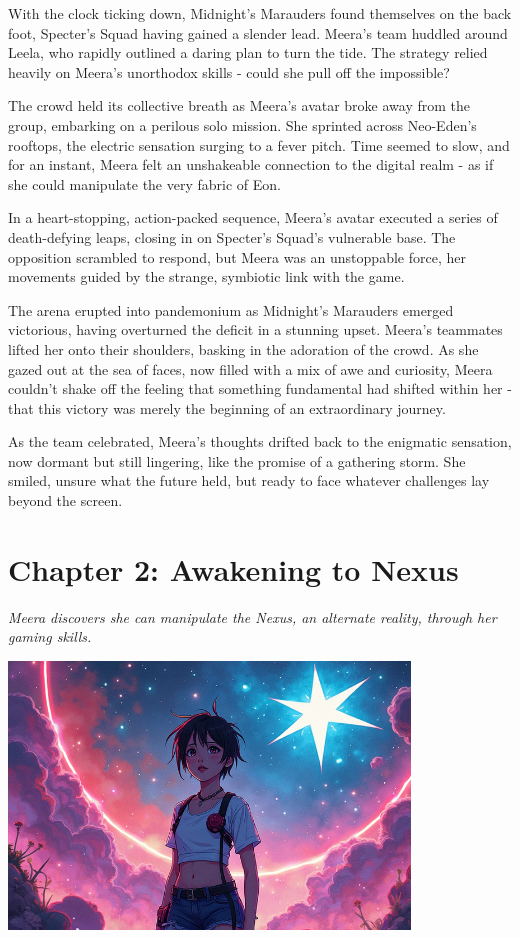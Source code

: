 \documentclass[12pt]{report}  %
\begin{document}
With the clock ticking down, Midnight's Marauders found themselves on
the back foot, Specter's Squad having gained a slender lead. Meera's
team huddled around Leela, who rapidly outlined a daring plan to turn
the tide. The strategy relied heavily on Meera's unorthodox skills -
could she pull off the impossible?

The crowd held its collective breath as Meera's avatar broke away from
the group, embarking on a perilous solo mission. She sprinted across
Neo-Eden's rooftops, the electric sensation surging to a fever pitch.
Time seemed to slow, and for an instant, Meera felt an unshakeable
connection to the digital realm - as if she could manipulate the very
fabric of Eon.

In a heart-stopping, action-packed sequence, Meera's avatar executed a
series of death-defying leaps, closing in on Specter's Squad's
vulnerable base. The opposition scrambled to respond, but Meera was an
unstoppable force, her movements guided by the strange, symbiotic link
with the game.

The arena erupted into pandemonium as Midnight's Marauders emerged
victorious, having overturned the deficit in a stunning upset. Meera's
teammates lifted her onto their shoulders, basking in the adoration of
the crowd. As she gazed out at the sea of faces, now filled with a mix
of awe and curiosity, Meera couldn't shake off the feeling that
something fundamental had shifted within her - that this victory was
merely the beginning of an extraordinary journey.

As the team celebrated, Meera's thoughts drifted back to the enigmatic
sensation, now dormant but still lingering, like the promise of a
gathering storm. She smiled, unsure what the future held, but ready to
face whatever challenges lay beyond the screen.


\chapter*{Chapter 2: Awakening to Nexus}
\textit{Meera discovers she can manipulate the Nexus, an alternate reality, through her gaming skills.}

\begin{center}
\includegraphics[width=0.8\textwidth]{stories/my_story/step_6/scenes/nexus_awakening.live.png}
\end{center}
\end{document}
